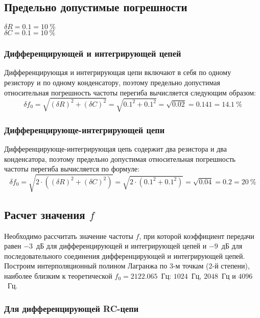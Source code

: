 \subsection{Предельно допустимые погрешности}

\begin{center}
	$\delta R = 0.1 = 10~\%$ \\
	$\delta C = 0.1 = 10~\%$ \\
\end{center}

\subsubsection{Дифференцирующей и интегрирующей цепей}

Дифференцирующая и интегрирующая цепи включают в себя по одному резистору и по одному конденсатору, поэтому предельно допустимая относительная погрешность частоты перегиба вычисляется следующим образом:
\[
\delta f_0 = \sqrt{(\delta R)^2 + (\delta C)^2} = \sqrt{0.1^2 + 0.1^2} = \sqrt{0.02} = 0.141 = 14.1~\%
\]

\subsubsection{Дифференцирующе-интегрирующей цепи}

Дифференцирующе-интегрирующая цепь содержит два резистора и два конденсатора, поэтому предельно допустимая относительная погрешность частоты перегиба вычисляется по формуле:
\[
\delta f_0 = \sqrt{2 \cdot ((\delta R)^2 + (\delta C)^2)} = \sqrt{2 \cdot (0.1^2 + 0.1^2)} = \sqrt{0.04} = 0.2 = 20~\%
\]

\subsection{Расчет значения $f$}

Необходимо рассчитать значение частоты $f$, при которой коэффициент передачи равен $-3$~дБ для дифференцирующей и интегрирующей цепей и $-9$~дБ для последовательного соединения дифференцирующей и интегрирующей цепей. Построим интерполяционный полином Лагранжа по 3-м точкам (2-й степени), наиболее близким к теоретической $f_0 = 2122.065$~Гц: $1024$~Гц, $2048$~Гц и $4096$~Гц.

\subsubsection{Для дифференцирующей RC-цепи}

